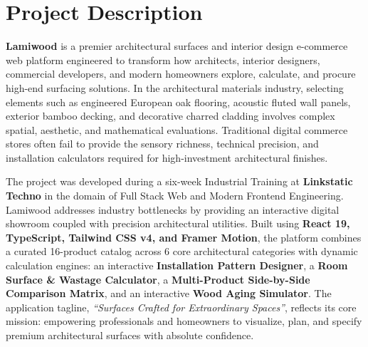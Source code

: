 \documentclass[12pt,a4paper]{report}
\begin{document}
\section{Project Description}
\textbf{Lamiwood} is a premier architectural surfaces and interior design e-commerce web platform engineered to transform how architects, interior designers, commercial developers, and modern homeowners explore, calculate, and procure high-end surfacing solutions. In the architectural materials industry, selecting elements such as engineered European oak flooring, acoustic fluted wall panels, exterior bamboo decking, and decorative charred cladding involves complex spatial, aesthetic, and mathematical evaluations. Traditional digital commerce stores often fail to provide the sensory richness, technical precision, and installation calculators required for high-investment architectural finishes.

The project was developed during a six-week Industrial Training at \textbf{Linkstatic Techno} in the domain of Full Stack Web and Modern Frontend Engineering. Lamiwood addresses industry bottlenecks by providing an interactive digital showroom coupled with precision architectural utilities. Built using \textbf{React 19, TypeScript, Tailwind CSS v4, and Framer Motion}, the platform combines a curated 16-product catalog across 6 core architectural categories with dynamic calculation engines: an interactive \textbf{Installation Pattern Designer}, a \textbf{Room Surface \& Wastage Calculator}, a \textbf{Multi-Product Side-by-Side Comparison Matrix}, and an interactive \textbf{Wood Aging Simulator}. The application tagline, \textit{``Surfaces Crafted for Extraordinary Spaces''}, reflects its core mission: empowering professionals and homeowners to visualize, plan, and specify premium architectural surfaces with absolute confidence.
\end{document}
